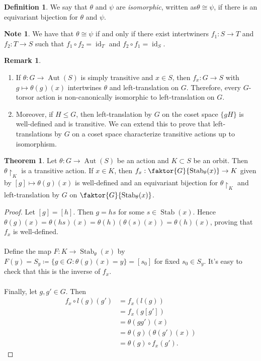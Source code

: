\documentclass[10pt,letterpaper,cm]{nupset}
\theoremstyle{definition}
\newtheorem*{definition}{Definition}
\newtheorem{note}{Note}
\newtheorem{remark}{Remark}
\newtheorem{theorem}{Theorem}
\newcommand{\1}{\mathbf{1}}
\newcommand{\0}{\vec 0}
\DeclareMathOperator{\id}{id}
\DeclareMathOperator{\aut}{Aut}
\DeclareMathOperator{\stab}{Stab}
\begin{document}
\begin{definition}
We say that $\theta$ and $\psi$ are \textit{isomorphic}, written as$\theta \cong \psi$,  if there is an equivariant bijection for $\theta$ and $\psi$.
\end{definition}

\begin{note}
We have that $\theta \cong \psi$ if and only if there exist intertwiners $f_1 : S \to T$ and $f_2 : T \to S$ such that $f_1 \circ f_2 = \id_T$ and $f_2 \circ f_1 = \id_S$. 
\end{note}

\begin{remark} $ $
\begin{enumerate}
\item If $\theta: G \to \aut(S)$ is simply transitive and $x \in S$, then $f_x: G \to S$ with $g \mapsto \theta(g)(x)$ intertwines $\theta$ and left-translation on $G$. Therefore, every $G$-torsor action is non-canonically isomorphic to left-translation on $G$.
\item Moreover, if $H \leq G$, then left-translation by $G$ on the coset space $\{gH\}$ is well-defined and is transitive. We can extend this to prove that left-translations by $G$ on a coset space characterize transitive actions up to isomorphism.
\end{enumerate}
\end{remark}

\begin{theorem}
Let $ \theta: G \to \aut(S)$ be an action and $K \subset S$ be an orbit. Then $\theta \restriction_K$ is a transitive action. If $x \in K$, then $f_x: \faktor{G}{\stab_\theta(x)} \to K$ given by $[g] \mapsto \theta(g)(x)$ is well-defined and an equivariant bijection for $\theta \restriction_K$ and left-translation by $G$ on $\faktor{G}{\stab_\theta(x)}$.
\end{theorem}

\begin{proof}
Let $[g] = [h]$. Then $g = hs$ for some $s \in \stab(x)$. Hence $\theta(g)(x) = \theta(hs)(x) = \theta(h)(\theta(s)(x)) = \theta(h)(x)$, proving that $f_x$ is well-defined. \\  \\
Define the map $F: K \to \stab_\theta(x)$ by $F(y) = S_y \coloneqq  \{g \in G : \theta(g)(x) = y\} = [s_0]$ for fixed $s_0 \in S_y$.
It's easy to check that this is the inverse of $f_x$. 
\\ \\
Finally, let $g, g'\in G$. Then 
\begin{align*} f_x \circ l(g)(g') & = f_x(l(g)) \\ & = f_x(g[g'])  \\ & = \theta(gg')(x) 
 \\ & = \theta(g)(\theta(g')(x))\\ &  = \theta(g) \circ f_x(g').
\end{align*}
\end{proof}
\end{document}
